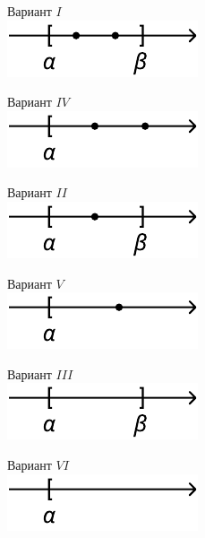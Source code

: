 \begin {figure} [h]
    \hspace{10mm}
    \begin {minipage} [t] {0.5\linewidth}
        Вариант $I$ \\
        \includegraphics{images/a_dd_b.pdf}
    \end {minipage}
    \hfill
    \begin {minipage} [t] {0.5\linewidth}
        Вариант $IV$ \\
        \includegraphics{images/a_dd_inf.pdf}
    \end {minipage}
    \vfill \vspace{1cm} \hspace{10mm}
    \begin {minipage} [t] {0.5\linewidth}
        Вариант $II$ \\
        \includegraphics{images/a_d_b.pdf}
    \end {minipage}
    \hfill
    \begin {minipage} [t] {0.5\linewidth}
        Вариант $V$ \\
        \includegraphics{images/a_d_inf.pdf}
    \end {minipage}
    \vfill \vspace{1cm} \hspace{10mm}
    \begin {minipage} [t] {0.5\linewidth}
        Вариант $III$ \\
        \includegraphics{images/a_b.pdf}
    \end {minipage}
    \hfill
    \begin {minipage} [t] {0.5\linewidth}
        Вариант $VI$ \\
        \includegraphics{images/a_inf.pdf}
    \end {minipage}
\end {figure}


